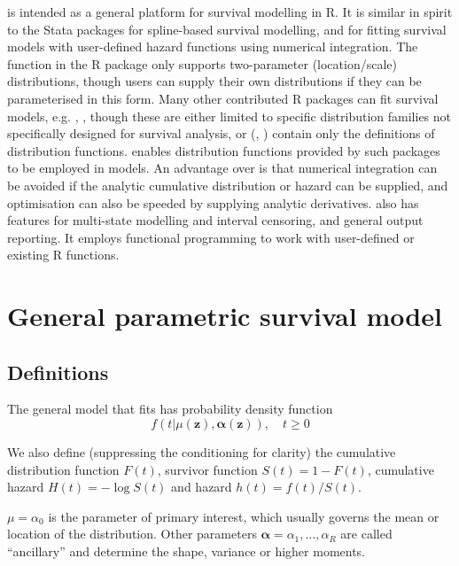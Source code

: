 \documentclass[nojss,nofooter]{jss}
\begin{document}
 is intended as a general platform for survival
modelling in R.  It is similar in spirit to the Stata packages
 \citep{stpm2} for spline-based survival modelling, and
 \citep{stgenreg} for fitting survival models with
user-defined hazard functions using numerical integration. The
 function in the R package  only supports
two-parameter (location/scale) distributions, though users can supply
their own distributions if they can be parameterised in this form.
Many other contributed R packages can fit survival models,
e.g.  \citep{eha},  \citep{yee:wild}, though these
are either limited to specific distribution families not specifically
designed for survival analysis, or (,
\citet{actudistns}) contain only the definitions of distribution
functions.   enables distribution functions provided by
such packages to be employed in models.  An advantage over
 is that numerical integration can be avoided if the
analytic cumulative distribution or hazard can be supplied, and
optimisation can also be speeded by supplying analytic derivatives.
 also has features for multi-state modelling and
interval censoring, and general output reporting.  It employs
functional programming to work with user-defined or existing R
functions.



\section{General parametric survival model}

\subsection{Definitions} 

The general model that  fits has probability density function
\begin{equation}
  \label{eq:model}
  f(t | \mu(\mathbf{z}), \bm{\alpha}(\mathbf{z})), \quad t \geq 0  
\end{equation}

We also define (suppressing the conditioning for clarity) the
cumulative distribution function $F(t)$, survivor function $S(t) = 1 -
F(t)$, cumulative hazard $H(t) = -\log S(t)$ and hazard $h(t) =
f(t)/S(t)$.

$\mu=\alpha_0$ is the parameter of primary interest,
which usually governs the mean or location of the distribution.  Other
parameters $\bm{\alpha} = \alpha_1, \ldots, \alpha_R$ are called
``ancillary'' and determine the shape, variance or higher moments.
\end{document}
